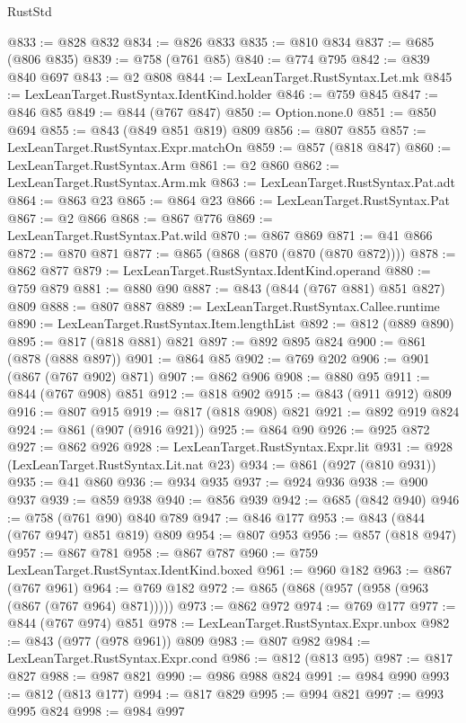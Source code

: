 \begin{lexlean}{RustStd}
\begin{coremodule}
@833 := @828 @832
@834 := @826 @833
@835 := @810 @834
@837 := @685 (@806 @835)
@839 := @758 (@761 @85)
@840 := @774 @795
@842 := @839 @840 @697
@843 := @2 @808
@844 := LexLeanTarget.RustSyntax.Let.mk
@845 := LexLeanTarget.RustSyntax.IdentKind.holder
@846 := @759 @845
@847 := @846 @85
@849 := @844 (@767 @847)
@850 := Option.none.{0}
@851 := @850 @694
@855 := @843 (@849 @851 @819) @809
@856 := @807 @855
@857 := LexLeanTarget.RustSyntax.Expr.matchOn
@859 := @857 (@818 @847)
@860 := LexLeanTarget.RustSyntax.Arm
@861 := @2 @860
@862 := LexLeanTarget.RustSyntax.Arm.mk
@863 := LexLeanTarget.RustSyntax.Pat.adt
@864 := @863 @23
@865 := @864 @23
@866 := LexLeanTarget.RustSyntax.Pat
@867 := @2 @866
@868 := @867 @776
@869 := LexLeanTarget.RustSyntax.Pat.wild
@870 := @867 @869
@871 := @41 @866
@872 := @870 @871
@877 := @865 (@868 (@870 (@870 (@870 @872))))
@878 := @862 @877
@879 := LexLeanTarget.RustSyntax.IdentKind.operand
@880 := @759 @879
@881 := @880 @90
@887 := @843 (@844 (@767 @881) @851 @827) @809
@888 := @807 @887
@889 := LexLeanTarget.RustSyntax.Callee.runtime
@890 := LexLeanTarget.RustSyntax.Item.lengthList
@892 := @812 (@889 @890)
@895 := @817 (@818 @881) @821
@897 := @892 @895 @824
@900 := @861 (@878 (@888 @897))
@901 := @864 @85
@902 := @769 @202
@906 := @901 (@867 (@767 @902) @871)
@907 := @862 @906
@908 := @880 @95
@911 := @844 (@767 @908) @851
@912 := @818 @902
@915 := @843 (@911 @912) @809
@916 := @807 @915
@919 := @817 (@818 @908) @821
@921 := @892 @919 @824
@924 := @861 (@907 (@916 @921))
@925 := @864 @90
@926 := @925 @872
@927 := @862 @926
@928 := LexLeanTarget.RustSyntax.Expr.lit
@931 := @928 (LexLeanTarget.RustSyntax.Lit.nat @23)
@934 := @861 (@927 (@810 @931))
@935 := @41 @860
@936 := @934 @935
@937 := @924 @936
@938 := @900 @937
@939 := @859 @938
@940 := @856 @939
@942 := @685 (@842 @940)
@946 := @758 (@761 @90) @840 @789
@947 := @846 @177
@953 := @843 (@844 (@767 @947) @851 @819) @809
@954 := @807 @953
@956 := @857 (@818 @947)
@957 := @867 @781
@958 := @867 @787
@960 := @759 LexLeanTarget.RustSyntax.IdentKind.boxed
@961 := @960 @182
@963 := @867 (@767 @961)
@964 := @769 @182
@972 := @865 (@868 (@957 (@958 (@963 (@867 (@767 @964) @871)))))
@973 := @862 @972
@974 := @769 @177
@977 := @844 (@767 @974) @851
@978 := LexLeanTarget.RustSyntax.Expr.unbox
@982 := @843 (@977 (@978 @961)) @809
@983 := @807 @982
@984 := LexLeanTarget.RustSyntax.Expr.cond
@986 := @812 (@813 @95)
@987 := @817 @827
@988 := @987 @821
@990 := @986 @988 @824
@991 := @984 @990
@993 := @812 (@813 @177)
@994 := @817 @829
@995 := @994 @821
@997 := @993 @995 @824
@998 := @984 @997

\end{coremodule}
\end{lexlean}
